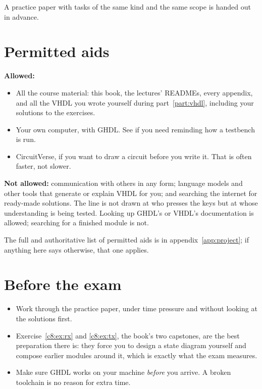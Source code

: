A practice paper with tasks of the same kind and the same scope is handed out in advance.

\section{Permitted aids}
\label{c9:sec:aids}

\textbf{Allowed:}
\begin{itemize}
  \item All the course material: this book, the lectures' READMEs, every appendix, and all the VHDL
    you wrote yourself during part~\ref{part:vhdl}, including your solutions to the exercises.
  \item Your own computer, with GHDL. See  if you need reminding how a
    testbench is run.
  \item CircuitVerse, if you want to draw a circuit before you write it. That is often faster, not
    slower.
\end{itemize}

\textbf{Not allowed:} communication with others in any form; language models and other tools that
generate or explain VHDL for you; and searching the internet for ready-made solutions. The line is
not drawn at who presses the keys but at whose understanding is being tested. Looking up GHDL's or
VHDL's documentation is allowed; searching for a finished module is not.

The full and authoritative list of permitted aids is in appendix~\ref{app:project}; if anything here
says otherwise, that one applies.

\section{Before the exam}
\label{c9:sec:prep}

\begin{itemize}
  \item Work through the practice paper, under time pressure and without looking at the solutions
    first.
  \item Exercise~\ref{c8:ex:rx} and \ref{c8:ex:tx}, the book's two capstones, are the best
    preparation there is: they force you to design a state diagram yourself and compose earlier
    modules around it, which is exactly what the exam measures.
  \item Make sure GHDL works on your machine \emph{before} you arrive. A broken toolchain is no
    reason for extra time.
\end{itemize}

